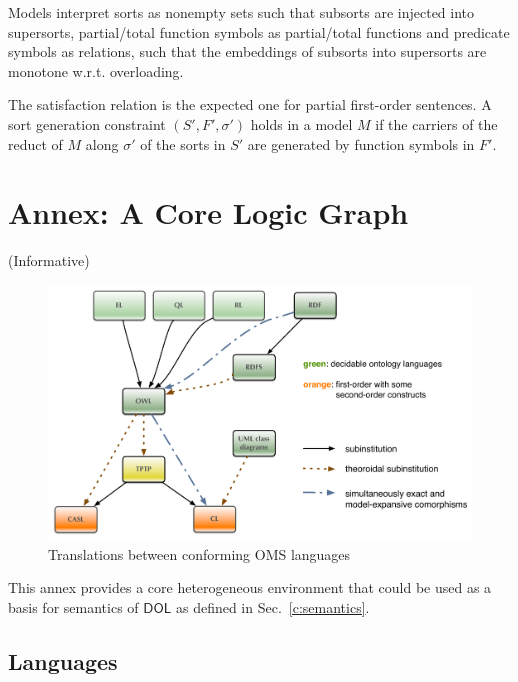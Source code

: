 \documentclass[10pt,fleqn,final]{scrreprt}
\newcommand*{\DOL}{\ensuremath{\mathsf{DOL}}\xspace}
\newcommand{\informative}[0]{{\begin{center}{\Large{(Informative})}\end{center}} \bigskip}
\newcommand{\sclause}[1]{\section{#1}}
\newcommand{\infannex}[1]{ \chapter{Annex: #1}  \informative }
\newenvironment{definitions}[0]{\medskip }{}
\begin{document}
\begin{definitions}
Models interpret sorts as nonempty sets such that subsorts are injected into supersorts,
partial/total function symbols as partial/total functions and 
predicate symbols as relations,
 such that the embeddings of subsorts into
supersorts are monotone w.r.t. overloading.

The satisfaction relation is the expected one for partial first-order sentences. A sort generation
constraint $(S', F', \sigma')$ holds in a model $M$ if the carriers of the reduct of $M$ along $\sigma'$ 
of the sorts in $S'$ are generated by function symbols in $F'$.

\infannex{A Core Logic Graph}\label{a:graph}


\begin{figure}
  \centering
  \includegraphics[width=\textwidth]{illustrations/ontograph-standards-new}
  \caption{Translations between conforming OMS languages}
  \label{fig:ontograph-standards}
\end{figure}

This annex provides a core heterogeneous environment that could be used as a basis for 
semantics of \DOL as defined in Sec.~\ref{c:semantics}.

\sclause{Languages}
 

\end{definitions}
\end{document}
